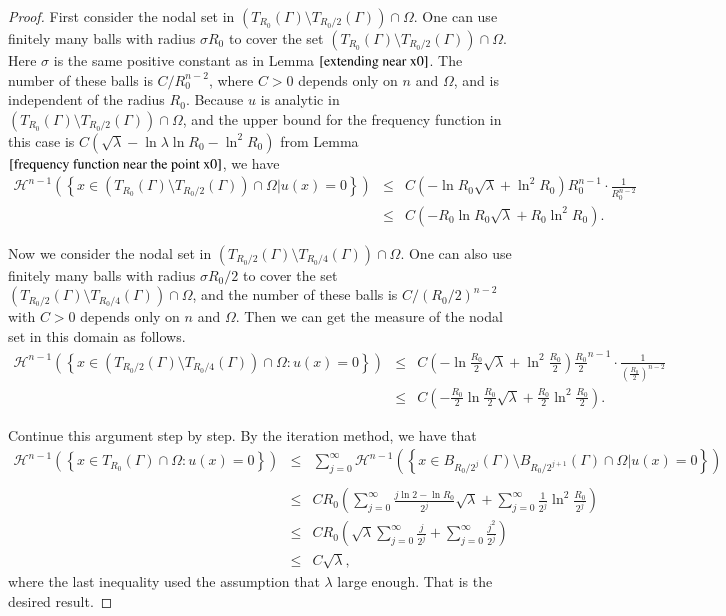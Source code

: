 \documentclass[a4paper, 12pt, onecolumn]{article} \textwidth 148mm
\begin{document}
\begin{proof}

First consider the nodal set in $\left(T_{R_0}(\Gamma)\setminus T_{R_0/2}(\Gamma)\right)\cap\Omega$.
One can use finitely many balls with radius $\sigma R_0$ to cover the set $(T_{R_0}(\Gamma)\setminus T_{R_0/2}(\Gamma))\cap\Omega$. Here $\sigma$ is the same positive constant as in Lemma $\ref{extending near x0}$. The number of these balls is $C/R_0^{n-2}$, where $C>0$ depends only on $n$ and $\Omega$, and is independent of the radius $R_0$.
Because $u$ is analytic in $\left(T_{R_0}(\Gamma)\setminus T_{R_0/2}(\Gamma)\right)\cap\Omega$,
and the upper bound for the frequency function in this case is $C(\sqrt{\lambda}-\ln\lambda\ln R_0-\ln^2R_0)$
from Lemma $\ref{frequency function near the point x0}$, we have
\begin{eqnarray*}
\mathcal{H}^{n-1}\left(\left\{x\in \left(T_{R_0}(\Gamma)\setminus T_{R_0/2}(\Gamma)\right)\cap\Omega|u(x)=0\right\}\right)&\leq& C(-\ln R_0\sqrt{\lambda}+\ln^2R_0)R_0^{n-1}\cdot\frac{1}{R_0^{n-2}}\\&\leq&C(-R_0\ln R_0\sqrt{\lambda}+R_0\ln^2R_0).
\end{eqnarray*}

Now we consider the nodal set in $\left(T_{R_0/2}(\Gamma)\setminus T_{R_0/4}(\Gamma)\right)\cap\Omega$. One can also use finitely many balls with radius $\sigma R_0/2$ to cover the set $\left(T_{R_0/2}(\Gamma)\setminus T_{R_0/4}(\Gamma)\right)\cap\Omega$, and the number of these balls is $C/(R_0/2)^{n-2}$ with $C>0$ depends only on $n$ and $\Omega$. Then we can get the measure of the nodal set in this domain as follows.
\begin{eqnarray*}
\mathcal{H}^{n-1}\left(\left\{x\in (T_{R_0/2}(\Gamma)\setminus T_{R_0/4}(\Gamma))\cap\Omega:u(x)=0\right\}\right)&\leq& C\left(-\ln\frac{R_0}{2}\sqrt{\lambda}+\ln^2\frac{R_0}{2}\right)
\frac{R_0}{2}^{n-1}\cdot\frac{1}{\left(\frac{R_0}{2}\right)^{n-2}}
\\&\leq&C\left(-\frac{R_0}{2}\ln\frac{R_0}{2}\sqrt{\lambda}+\frac{R_0}{2}\ln^2\frac{R_0}{2}\right).
\end{eqnarray*}

Continue this argument step by step.
By the iteration method, we have that
\begin{eqnarray*}
\mathcal{H}^{n-1}\left(\left\{x\in T_{R_0}(\Gamma)\cap\Omega:u(x)=0\right\}\right)&\leq&
\sum\limits_{j=0}^{\infty}\mathcal{H}^{n-1}\left(\left\{x\in B_{R_0/2^j}(\Gamma)\setminus B_{R_0/2^{j+1}}(\Gamma)\cap\Omega|u(x)=0\right\}\right)\\&
\\&\leq&CR_0\left(\sum\limits_{j=0}^{\infty}\frac{j\ln 2-\ln R_0}{2^j}\sqrt{\lambda}+\sum\limits_{j=0}^{\infty}\frac{1}{2^j}\ln^2\frac{R_0}{2^j}\right)
\\&\leq&CR_0\left(\sqrt{\lambda}\sum\limits_{j=0}^{\infty}\frac{j}{2^j}+\sum\limits_{j=0}^{\infty}\frac{j^2}{2^j}\right)
\\&\leq&C\sqrt{\lambda},
\end{eqnarray*}
where the last inequality used the assumption that $\lambda$ large enough. That is the desired result.
\end{proof}
\end{document}
